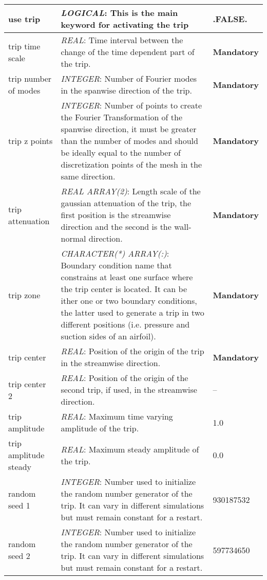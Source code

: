 \documentclass[a4paper,10pt]{report}
\begin{document}
\begin{table}[htbp]
\begin{tabular}{|l|p{10cm}|p{2.2cm}|}
use trip                        & \textit{LOGICAL}: This is the main keyword for activating the trip & .FALSE. \\ \hline
trip time scale                 & \textit{REAL}: Time interval between the change of the time dependent part of the trip. & \textbf{Mandatory} \\ \hline
trip number of modes            & \textit{INTEGER}: Number of Fourier modes in the spanwise direction of the trip. & \textbf{Mandatory} \\ \hline
trip z points                   & \textit{INTEGER}: Number of points to create the Fourier Transformation of the spanwise direction, it must be greater than the number of modes and should be ideally equal to the number of discretization points of the mesh in the same direction. & \textbf{Mandatory} \\ \hline
trip attenuation                & \textit{REAL ARRAY(2)}: Length scale of the gaussian attenuation of the trip, the first position is the streamwise direction and the second is the wall-normal direction. & \textbf{Mandatory} \\ \hline
trip zone                       & \textit{CHARACTER(*) ARRAY(:)}: Boundary condition name that constrains at least one surface where the trip center is located. It can be ither one or two boundary conditions, the latter used to generate a trip in two different positions (i.e. pressure and suction sides of an airfoil).  & \textbf{Mandatory} \\ \hline
trip center                     & \textit{REAL}: Position of the origin of the trip in the streamwise direction. & \textbf{Mandatory} \\ \hline
trip center 2                   & \textit{REAL}: Position of the origin of the second trip, if used, in the streamwise direction. & -- \\ \hline
trip amplitude                  & \textit{REAL}: Maximum time varying amplitude of the trip. & 1.0 \\ \hline
trip amplitude steady           & \textit{REAL}: Maximum steady amplitude of the trip. & 0.0 \\ \hline
random seed 1                   & \textit{INTEGER}: Number used to initialize the random number generator of the trip. It can vary in different simulations but must remain constant for a restart. & 930187532 \\ \hline
random seed 2                   & \textit{INTEGER}: Number used to initialize the random number generator of the trip. It can vary in different simulations but must remain constant for a restart. & 597734650 \\ \hline
\end{tabular}
\label{tab:trip}
\end{table}
\end{document}
